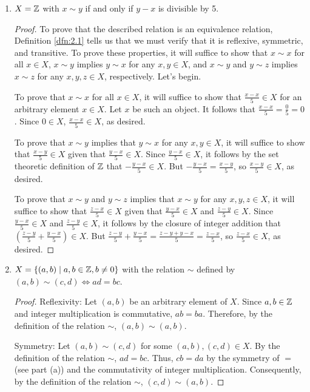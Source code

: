 \documentclass[../main.tex]{subfiles}
\begin{document}
\begin{exercise}
\begin{enumerate}[label={\alph*)},ref={\theexercise\alph*}]
\begin{proof}
        \end{proof}
        \item \label{exr:2.2d}$X=\mathbb{Z}$ with $x\sim y$ if and only if $y-x$ is divisible by 5.
        \begin{proof}
            To prove that the described relation is an equivalence relation, Definition \ref{dfn:2.1} tells us that we must verify that it is reflexive, symmetric, and transitive. To prove these properties, it will suffice to show that $x\sim x$ for all $x\in X$, $x\sim y$ implies $y\sim x$ for any $x,y\in X$, and $x\sim y$ and $y\sim z$ implies $x\sim z$ for any $x,y,z\in X$, respectively. Let's begin.\par
            To prove that $x\sim x$ for all $x\in X$, it will suffice to show that $\frac{x-x}{5}\in X$ for an arbitrary element $x\in X$. Let $x$ be such an object. It follows that $\frac{x-x}{5}=\frac{0}{5}=0$. Since $0\in X$, $\frac{x-x}{5}\in X$, as desired.\par
            To prove that $x\sim y$ implies that $y\sim x$ for any $x,y\in X$, it will suffice to show that $\frac{x-y}{5}\in X$ given that $\frac{y-x}{5}\in X$. Since $\frac{y-x}{5}\in X$, it follows by the set theoretic definition of $\mathbb{Z}$ that $-\frac{y-x}{5}\in X$. But $-\frac{y-x}{5}=\frac{x-y}{5}$, so $\frac{x-y}{5}\in X$, as desired.\par
            To prove that $x\sim y$ and $y\sim z$ implies that $x\sim y$ for any $x,y,z\in X$, it will suffice to show that $\frac{z-x}{5}\in X$ given that $\frac{y-x}{5}\in X$ and $\frac{z-y}{5}\in X$. Since $\frac{y-x}{5}\in X$ and $\frac{z-y}{5}\in X$, it follows by the closure of integer addition that $\left( \frac{z-y}{5}+\frac{y-x}{5} \right)\in X$. But $\frac{z-y}{5}+\frac{y-x}{5}=\frac{z-y+y-x}{5}=\frac{z-x}{5}$, so $\frac{z-x}{5}\in X$, as desired.
        \end{proof}
        \item \label{exr:2.2e}$X=\{(a,b)\mid a,b\in\mathbb{Z},b\neq 0\}$ with the relation $\sim$ defined by $(a,b)\sim(c,d)\Longleftrightarrow ad=bc$.
        \begin{proof}
            Reflexivity: Let $(a,b)$ be an arbitrary element of $X$. Since $a,b\in\mathbb{Z}$ and integer multiplication is commutative, $ab=ba$. Therefore, by the definition of the relation $\sim$, $(a,b)\sim(a,b)$.\par
            Symmetry: Let $(a,b)\sim(c,d)$ for some $(a,b),(c,d)\in X$. By the definition of the relation $\sim$, $ad=bc$. Thus, $cb=da$ by the symmetry of $=$ (see part (a)) and the commutativity of integer multiplication. Consequently, by the definition of the relation $\sim$, $(c,d)\sim(a,b)$.\par

\end{proof}
\end{enumerate}
\end{exercise}
\end{document}
